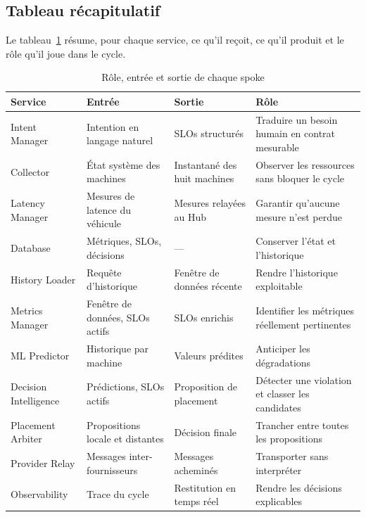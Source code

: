 \subsection{Tableau récapitulatif}
Le tableau~\ref{tab:spokes} résume, pour chaque service, ce qu'il reçoit, ce qu'il produit et le rôle qu'il joue dans le cycle.

\begin{table}[H]
    \centering
    \caption{Rôle, entrée et sortie de chaque spoke}
    \label{tab:spokes}
    \footnotesize
    \begin{tabular}{|p{2.6cm}|p{3.2cm}|p{3.2cm}|p{4.2cm}|}
        \hline
        \textbf{Service} & \textbf{Entrée} & \textbf{Sortie} & \textbf{Rôle} \\
        \hline
        Intent Manager & Intention en langage naturel & SLOs structurés & Traduire un besoin humain en contrat mesurable \\
        \hline
        Collector & État système des machines & Instantané des huit machines & Observer les ressources sans bloquer le cycle \\
        \hline
        Latency Manager & Mesures de latence du véhicule & Mesures relayées au Hub & Garantir qu'aucune mesure n'est perdue \\
        \hline
        Database & Métriques, SLOs, décisions & --- & Conserver l'état et l'historique \\
        \hline
        History Loader & Requête d'historique & Fenêtre de données récente & Rendre l'historique exploitable \\
        \hline
        Metrics Manager & Fenêtre de données, SLOs actifs & SLOs enrichis & Identifier les métriques réellement pertinentes \\
        \hline
        ML Predictor & Historique par machine & Valeurs prédites & Anticiper les dégradations \\
        \hline
        Decision Intelligence & Prédictions, SLOs actifs & Proposition de placement & Détecter une violation et classer les candidates \\
        \hline
        Placement Arbiter & Propositions locale et distantes & Décision finale & Trancher entre toutes les propositions \\
        \hline
        Provider Relay & Messages inter-fournisseurs & Messages acheminés & Transporter sans interpréter \\
        \hline
        Observability & Trace du cycle & Restitution en temps réel & Rendre les décisions explicables \\
        \hline
    \end{tabular}
\end{table}

